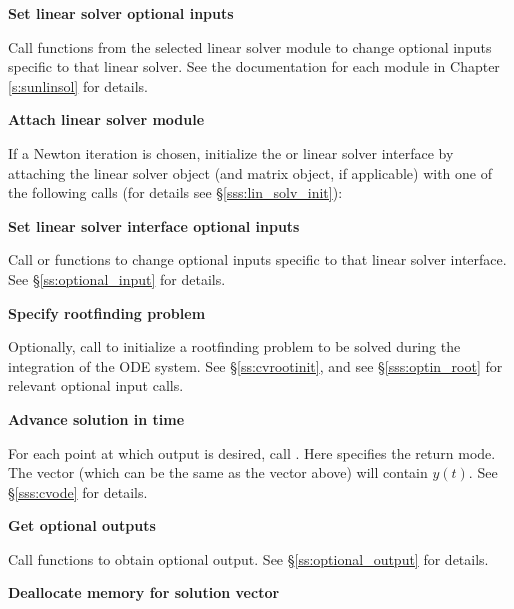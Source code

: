 \begin{Steps}
\item
  {\bf Set linear solver optional inputs}

  Call  functions from the selected linear solver module to
  change optional inputs specific to that linear solver.
  See the documentation for each {\sunlinsol} module in Chapter
  {\ref{s:sunlinsol}} for details.

\item\label{i:lin_solver_interface} 
  {\bf Attach linear solver module}

  If a Newton iteration is chosen, initialize the {\cvdls} or
  {\cvspils} linear solver interface by attaching the linear solver
  object (and matrix object, if applicable)
  with one of the following calls (for details see \S\ref{sss:lin_solv_init}):



\item
  {\bf Set linear solver interface optional inputs}

  Call  or  functions to change optional
  inputs specific to that linear solver interface. 
  See \S\ref{ss:optional_input} for details.

\item
  {\bf Specify rootfinding problem}

  Optionally, call  to initialize a rootfinding problem
  to be solved during the integration of the ODE system.
  See \S\ref{ss:cvrootinit}, and see \S\ref{sss:optin_root} for
  relevant optional input calls.

\item
  {\bf Advance solution in time}

  For each point at which output is desired, call
  .
  Here  specifies the return mode.
  The vector  (which can be the same as
  the vector  above) will contain $y(t)$.
  See \S\ref{sss:cvode} for details.
  
\item
  {\bf Get optional outputs}

  Call  functions to obtain optional output.
  See \S\ref{ss:optional_output} for details.

\item
  {\bf Deallocate memory for solution vector}


\end{Steps}
